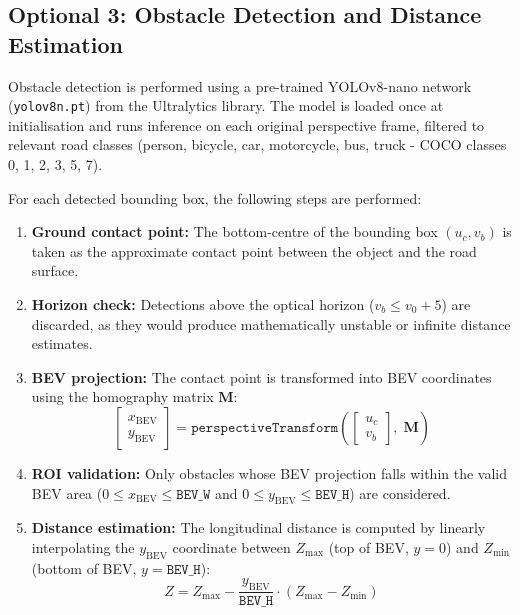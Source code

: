 \documentclass[11pt,a4paper]{article}
\begin{document}
\subsection{Optional 3: Obstacle Detection and Distance Estimation}
\label{sec:obstacle}

Obstacle detection is performed using a pre-trained YOLOv8-nano network (\texttt{yolov8n.pt}) from the Ultralytics library. The model is loaded once at initialisation and runs inference on each original perspective frame, filtered to relevant road classes (person, bicycle, car, motorcycle, bus, truck - COCO classes 0, 1, 2, 3, 5, 7).

For each detected bounding box, the following steps are performed:

\begin{enumerate}
    \item \textbf{Ground contact point:} The bottom-centre of the bounding box $(u_c, v_b)$ is taken as the approximate contact point between the object and the road surface.
    
    \item \textbf{Horizon check:} Detections above the optical horizon ($v_b \leq v_0 + 5$) are discarded, as they would produce mathematically unstable or infinite distance estimates.
    
    \item \textbf{BEV projection:} The contact point is transformed into BEV coordinates using the homography matrix $\mathbf{M}$:
    \begin{equation}
        \begin{bmatrix} x_{\text{BEV}} \\ y_{\text{BEV}} \end{bmatrix} = \texttt{perspectiveTransform}\left(\begin{bmatrix} u_c \\ v_b \end{bmatrix},\; \mathbf{M}\right)
    \end{equation}
    
    \item \textbf{ROI validation:} Only obstacles whose BEV projection falls within the valid BEV area ($0 \leq x_{\text{BEV}} \leq \texttt{BEV\_W}$ and $0 \leq y_{\text{BEV}} \leq \texttt{BEV\_H}$) are considered.
    
    \item \textbf{Distance estimation:} The longitudinal distance is computed by linearly interpolating the $y_{\text{BEV}}$ coordinate between $Z_{\max}$ (top of BEV, $y = 0$) and $Z_{\min}$ (bottom of BEV, $y = \texttt{BEV\_H}$):
    \begin{equation}
        Z = Z_{\max} - \frac{y_{\text{BEV}}}{\texttt{BEV\_H}} \cdot (Z_{\max} - Z_{\min})
        \label{eq:distance}
    \end{equation}
\end{enumerate}
\end{document}
